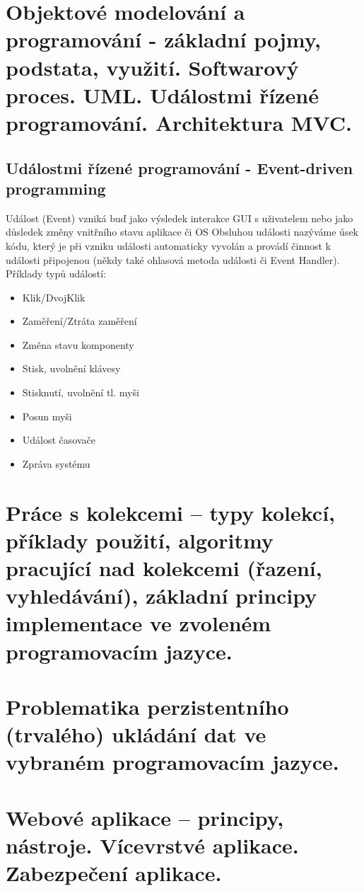 \section{Objektové modelování a programování - základní pojmy, podstata, využití. Softwarový proces. UML. Událostmi řízené programování. Architektura MVC.}

\newpage

\subsection{Událostmi řízené programování - Event-driven programming}

Událost (Event) vzniká buď jako výsledek interakce GUI s uživatelem nebo jako důsledek změny vnitřního stavu aplikace či OS
Obsluhou události nazýváme úsek kódu, který je při vzniku události automaticky vyvolán a provádí činnost k události připojenou (někdy také ohlasová metoda události či Event Handler).
Příklady typů událostí:
\begin{itemize}
\item Klik/DvojKlik
\item Zaměření/Ztráta zaměření
\item Změna stavu komponenty
\item Stisk, uvolnění klávesy
\item Stisknutí, uvolnění tl. myši
\item Posun myši
\item Událost časovače
\item Zpráva systému
\end{itemize}

\section{ Práce s kolekcemi – typy kolekcí, příklady použití, algoritmy pracující nad kolekcemi (řazení, vyhledávání), základní principy implementace ve zvoleném programovacím jazyce.}

\section{Problematika perzistentního (trvalého) ukládání dat ve vybraném programovacím jazyce.}

\section{ Webové aplikace – principy, nástroje. Vícevrstvé aplikace. Zabezpečení aplikace.}

